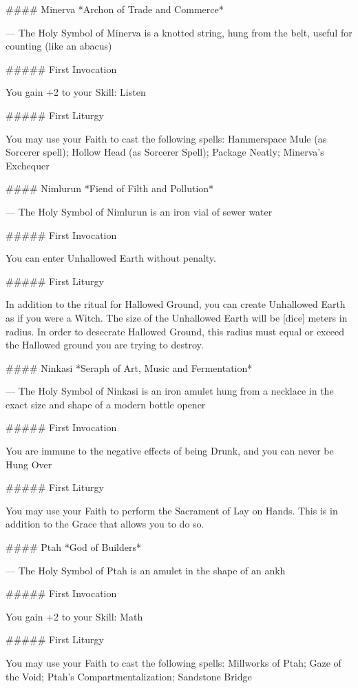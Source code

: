 #### Minerva
*Archon of Trade and Commerce*

---
The Holy Symbol of Minerva is a knotted string, hung from the belt, useful for counting (like an abacus)

##### First Invocation

You gain +2 to your Skill: Listen

##### First Liturgy

You may use your Faith to cast the following spells: Hammerspace Mule (as Sorcerer spell); Hollow Head (as Sorcerer Spell); Package Neatly; Minerva's Exchequer





#### Nimlurun
*Fiend of Filth and Pollution*

---
The Holy Symbol of Nimlurun is an iron vial of sewer water

##### First Invocation

You can enter Unhallowed Earth without penalty.

##### First Liturgy

In addition to the ritual for Hallowed Ground, you can create Unhallowed Earth as if you were a Witch.  The size of the Unhallowed Earth will be [dice] meters in radius.  In order to desecrate Hallowed Ground, this radius must equal or exceed the Hallowed ground you are trying to destroy.




#### Ninkasi
*Seraph of Art, Music and Fermentation*

---
The Holy Symbol of Ninkasi is an iron amulet hung from a necklace in the exact size and shape of a modern bottle opener

##### First Invocation

You are immune to the negative effects of being Drunk, and you can never be Hung Over

##### First Liturgy

You may use your Faith to perform the Sacrament of Lay on Hands.  This is in addition to the Grace that allows you to do so.




#### Ptah
*God of Builders*

---
The Holy Symbol of Ptah is an amulet in the shape of an ankh

##### First Invocation

You gain +2 to your Skill: Math

##### First Liturgy

You may use your Faith to cast the following spells: Millworks of Ptah; Gaze of the Void; Ptah's Compartmentalization; Sandstone Bridge







